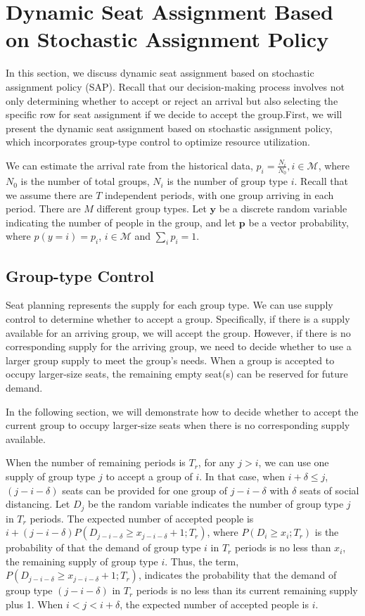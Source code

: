 \section{Dynamic Seat Assignment Based on Stochastic Assignment Policy}
In this section, we discuss dynamic seat assignment based on stochastic assignment policy (SAP). Recall that our decision-making process involves not only determining whether to accept or reject an arrival but also selecting the specific row for seat assignment if we decide to accept the group.First, we will present the dynamic seat assignment based on stochastic assignment policy, which incorporates group-type control to optimize resource utilization.

We can estimate the arrival rate from the historical data, $p_i = \frac{N_{i}}{N_{0}}, i \in \mathcal{M}$, where $N_{0}$ is the number of total groups, $N_{i}$ is the number of group type $i$. Recall that we assume there are $T$ independent periods, with one group arriving in each period. There are $M$ different group types. Let $\mathbf{y}$ be a discrete random variable indicating the number of people in the group, and let $\mathbf{p}$ be a vector probability, where $p(y = i) = p_i$, $i \in \mathcal{M}$ and $\sum_{i} p_{i} =1$.


\subsection{Group-type Control}\label{nested_policy}
Seat planning represents the supply for each group type. We can use supply control to determine whether to accept a group. Specifically, if there is a supply available for an arriving group, we will accept the group. However, if there is no corresponding supply for the arriving group, we need to decide whether to use a larger group supply to meet the group's needs. When a group is accepted to occupy larger-size seats, the remaining empty seat(s) can be reserved for future demand.

In the following section, we will demonstrate how to decide whether to accept the current group to occupy larger-size seats when there is no corresponding supply available.

When the number of remaining periods is $T_r$, for any $j>i$, we can use one supply of group type $j$ to accept a group of $i$. In that case, when $i+\delta \leq j$, $(j-i-\delta)$ seats can be provided for one group of $j-i-\delta$ with $\delta$ seats of social distancing. Let $D_j$ be the random variable indicates the number of group type $j$ in $T_r$ periods. The expected number of accepted people is $i + (j-i-\delta)P(D_{j-i-\delta} \geq x_{j-i-\delta}+1; T_r)$, where $P(D_i \geq x_i; T_r)$ is the probability of that the demand of group type $i$ in $T_r$ periods is no less than $x_i$, the remaining supply of group type $i$. Thus, the term, $P(D_{j-i-\delta} \geq x_{j-i-\delta}+1; T_r)$, indicates the probability that the demand of group type $(j-i-\delta)$ in $T_r$ periods is no less than its current remaining supply plus 1. When $i <j < i+\delta$, the expected number of accepted people is $i$.

